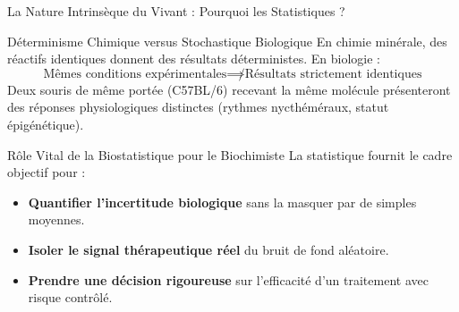 \documentclass[aspectratio=169,10pt]{beamer}
\begin{document}
\begin{frame}{La Nature Intrinsèque du Vivant : Pourquoi les Statistiques ?}
  \begin{conceptbox}{Déterminisme Chimique versus Stochastique Biologique}
    En chimie minérale, des réactifs identiques donnent des résultats déterministes. En biologie :
    \begin{equation*}
      \text{Mêmes conditions expérimentales} \not\implies \text{Résultats strictement identiques}
    \end{equation*}
    Deux souris de même portée (C57BL/6) recevant la même molécule présenteront des réponses physiologiques distinctes (rythmes nycthéméraux, statut épigénétique).
  \end{conceptbox}
  \vspace{1mm}
  \begin{biobox}{Rôle Vital de la Biostatistique pour le Biochimiste}
    La statistique fournit le cadre objectif pour :
    \begin{itemize}\setlength{\itemsep}{1pt}
      \item \textbf{Quantifier l'incertitude biologique} sans la masquer par de simples moyennes.
      \item \textbf{Isoler le signal thérapeutique réel} du bruit de fond aléatoire.
      \item \textbf{Prendre une décision rigoureuse} sur l'efficacité d'un traitement avec risque contrôlé.
    \end{itemize}
  \end{biobox}
\end{frame}
\end{document}
